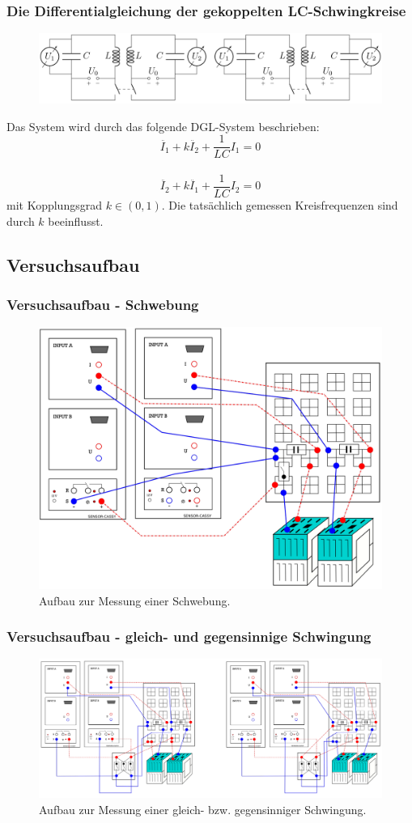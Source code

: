 \documentclass{beamer}
\begin{document}
\begin{frame}
\frametitle{Die Differentialgleichung der gekoppelten LC-Schwingkreise}
\begin{figure}
\includegraphics[width = \textwidth]{abbildungen/theorie_LC.png}
\end{figure}

Das System wird durch das folgende DGL-System beschrieben:
$$\ddot{I_1} + k \ddot{I_2} + \frac{1}{LC} I_1 = 0$$\ \\
$$\ddot{I_2} + k \ddot{I_1} + \frac{1}{LC} I_2 = 0$$
mit Kopplungsgrad $k\in (0,1)$. Die tatsächlich gemessen Kreisfrequenzen sind durch $k$ beeinflusst.
\end{frame}

\subsection{Versuchsaufbau}

\begin{frame}
\frametitle{Versuchsaufbau - Schwebung}
\begin{figure}
\includegraphics[width=0.6\linewidth]{abbildungen/aufbau_LC.png}
\caption{Aufbau zur Messung einer Schwebung.}
\end{figure}
\end{frame}

\begin{frame}
\frametitle{Versuchsaufbau - gleich- und gegensinnige Schwingung}
\begin{figure}
\includegraphics[width=\linewidth]{abbildungen/aufbau_LC_gg.png}
\caption{Aufbau zur Messung einer gleich- bzw. gegensinniger Schwingung.}
\end{figure}
\end{frame}
\end{document}
